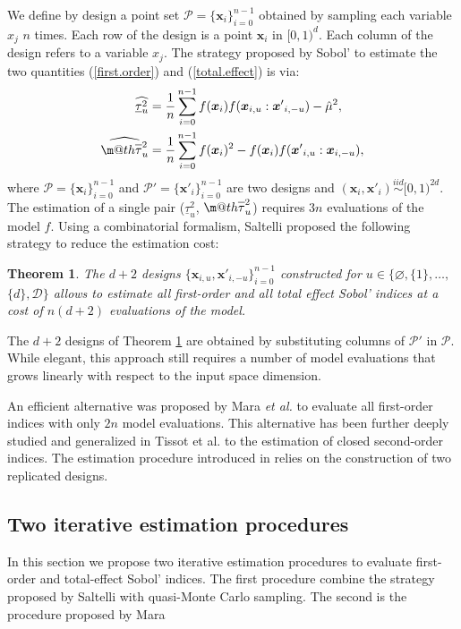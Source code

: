 \documentclass[]{elsarticle}
\makeatletter
\newtheorem{theorem}{Theorem}
\theoremstyle{definition}
\newcommand{\bvec}[1]{\boldsymbol{#1}}
\newcommand{\vx}{\bvec{x}}
\newcommand\iid{\stackrel{iid}{\sim}}
\newcommand*{\ov}[1]{
  \m@th\overline{\mbox{#1}\raisebox{2mm}{}}
}
\makeatother
\begin{document}
We define by design a point set $\mathcal{P}=\{\vx_i\}_{i=0}^{n-1}$ obtained by sampling each variable $x_j$ $n$ times. Each row of the design is a point $\vx_i$ in $[0,1)^d$. Each column of the design refers to a variable $x_j$. The strategy proposed by Sobol' to estimate the two quantities (\ref{first.order}) and (\ref{total.effect}) is via:
\begin{align}
\widehat{\underline{\tau}_u^2} & = \frac{1}{n} \sum \limits_{i=0}^{n-1} f(\vx_i)f(\vx_{i,u}:{\vx'}_{i,-u})-\hat{\mu}^2,\\
\widehat{\ov{$\tau$}_u^2} & = \frac{1}{n} \sum \limits_{i=0}^{n-1} f(\vx_i)^2 - f(\vx_i)f({\vx'}_{i,u}:\vx_{i,-u}),
\end{align}
where $\mathcal{P}=\{\vx_i\}_{i=0}^{n-1}$ and $\mathcal{P'}=\{{\vx'}_i\}_{i=0}^{n-1}$ are two designs and $(\vx_i,{\vx'}_i) \iid [0,1)^{2d}$. The estimation of a single pair ($\underline{\tau}_u^2$, $\ov{$\tau$}_u^2$) requires $3n$ evaluations of the model $f$. Using a combinatorial formalism, Saltelli \cite{Saltelli} proposed the following strategy to reduce the estimation cost:
\begin{theorem}
\label{saltelli.theorem}
The $d+2$ designs $\{\vx_{i,u},{\vx'}_{i,-u}\}_{i=0}^{n-1}$ constructed for $u \in \{\varnothing,\{1\},\dots,$ $\{d\},\mathcal{D}\}$ allows to estimate all first-order and all total effect Sobol' indices at a cost of $n(d+2)$ evaluations of the model.
\end{theorem}
The $d+2$ designs of Theorem \ref{saltelli.theorem} are obtained by substituting columns of $\mathcal{P'}$ in $\mathcal{P}$. While elegant, this approach still requires a number of model evaluations that grows linearly with respect to the input space dimension.

An efficient alternative was proposed by Mara \textit{et al.} \cite{Mara} to evaluate all first-order indices with only $2n$ model evaluations. This alternative has been further deeply studied and generalized in Tissot
et al. \cite{Mara} to the estimation of closed second-order indices. The estimation procedure introduced in \cite{Mara} relies on the construction of two replicated designs.

\subsection{Two iterative estimation procedures}

In this section we propose two iterative estimation procedures to evaluate first-order and total-effect Sobol' indices. The first procedure combine the strategy proposed by Saltelli with quasi-Monte Carlo sampling. The second is the procedure proposed by Mara 
\end{document}
